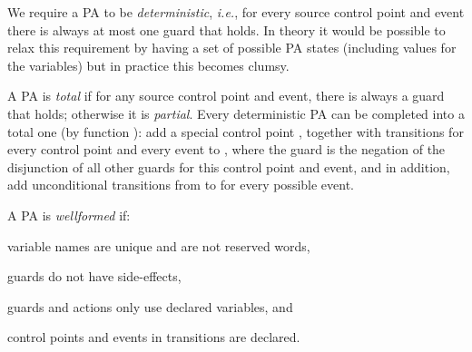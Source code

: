 We require a PA to be \emph{deterministic}, \emph{i.e.}, for every source
control point and event there is always at most one guard that holds.
In theory it would be possible to relax this requirement by having a set of
possible PA states (including values for the variables) but in practice this becomes clumsy.

A PA is \emph{total} if for any source control point and event,
there is always a guard that holds; otherwise it is
\emph{partial}. Every deterministic PA can be completed into a total
one (by function \complete): add a special control point
\halted, together with transitions for every control point and every event
to \halted, where the guard is the negation of the
disjunction of all other guards for this control point and event, and
in addition, add unconditional transitions from \halted to \halted
for every possible event.

A PA is \emph{wellformed} if:
\begin{inparaenum}
\item variable names are unique and are not reserved words,
\item guards do not have side-effects,
\item guards and actions only use declared variables, and
\item control points and events in transitions are declared.
\end{inparaenum}

